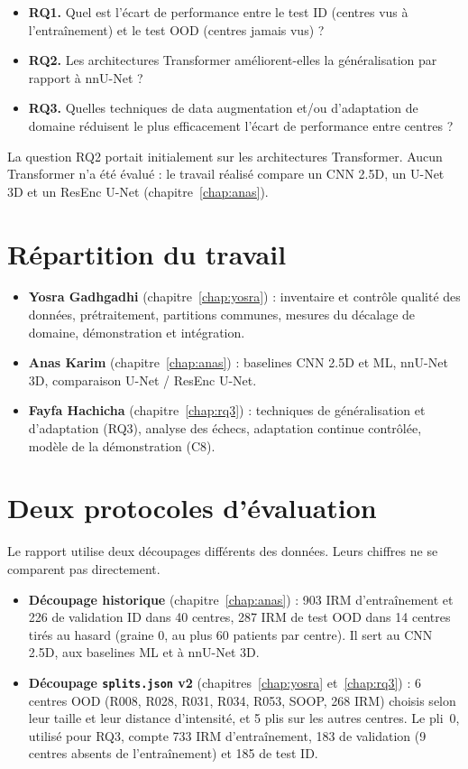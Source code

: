 \documentclass[11pt,a4paper]{report}
\begin{document}
\begin{itemize}
  \item \textbf{RQ1.} Quel est l'écart de performance entre le test ID (centres vus à l'entraînement) et le test OOD (centres jamais vus) ?
  \item \textbf{RQ2.} Les architectures Transformer améliorent-elles la généralisation par rapport à nnU-Net ?
  \item \textbf{RQ3.} Quelles techniques de data augmentation et/ou d'adaptation de domaine réduisent le plus efficacement l'écart de performance entre centres ?
\end{itemize}
La question RQ2 portait initialement sur les architectures Transformer.
Aucun Transformer n'a été évalué : le travail réalisé compare un CNN 2.5D, un U-Net 3D et un ResEnc U-Net (chapitre~\ref{chap:anas}).

\section*{Répartition du travail}

\begin{itemize}
  \item \textbf{Yosra Gadhgadhi} (chapitre~\ref{chap:yosra}) : inventaire et contrôle qualité des données, prétraitement, partitions communes, mesures du décalage de domaine, démonstration et intégration.
  \item \textbf{Anas Karim} (chapitre~\ref{chap:anas}) : baselines CNN 2.5D et ML, nnU-Net 3D, comparaison U-Net / ResEnc U-Net.
  \item \textbf{Fayfa Hachicha} (chapitre~\ref{chap:rq3}) : techniques de généralisation et d'adaptation (RQ3), analyse des échecs, adaptation continue contrôlée, modèle de la démonstration (C8).
\end{itemize}

\section*{Deux protocoles d'évaluation}
\label{sec:deux-protocoles}

Le rapport utilise deux découpages différents des données. Leurs chiffres ne se comparent pas directement.

\begin{itemize}
  \item \textbf{Découpage historique} (chapitre~\ref{chap:anas}) : 903 IRM d'entraînement et 226 de validation ID dans 40 centres, 287 IRM de test OOD dans 14 centres tirés au hasard (graine 0, au plus 60 patients par centre). Il sert au CNN 2.5D, aux baselines ML et à nnU-Net 3D.
  \item \textbf{Découpage \nolinkurl{splits.json} v2} (chapitres~\ref{chap:yosra} et~\ref{chap:rq3}) : 6 centres OOD (R008, R028, R031, R034, R053, SOOP, 268 IRM) choisis selon leur taille et leur distance d'intensité, et 5 plis sur les autres centres. Le pli~0, utilisé pour RQ3, compte 733 IRM d'entraînement, 183 de validation (9 centres absents de l'entraînement) et 185 de test ID.
\end{itemize}
\end{document}
